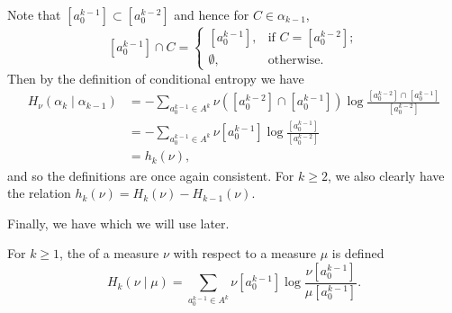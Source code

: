 Note that $[a_0^{k - 1}] \subset [a_0^{k - 2}]$ and hence for $C \in \alpha_{k - 1}$,
\[
	[a_0^{k - 1}] \cap C =
	\begin{cases}
		\left[a_0^{k - 1}\right],	& \text{if } C = [a_0^{k - 2}]; \\
		\emptyset,	& \text{otherwise}.
	\end{cases}
\]
Then by the definition of conditional entropy we have
\begin{align*}
	H_\nu(\alpha_k \mid \alpha_{k - 1}) &= -\sum_{a_0^{k - 1} \in A^k}{\nu([a_0^{k - 2}] \cap [a_0^{k - 1}]) \log{\frac{[a_0^{k - 2}] \cap [a_0^{k - 1}]}{[a_0^{k - 2}]}}} \\
		&= -\sum_{a_0^{k - 1} \in A^k}{\nu[a_0^{k - 1}] \log{\frac{[a_0^{k - 1}]}{[a_0^{k - 2}]}}} \\
		&= h_k(\nu),
\end{align*}
and so the definitions are once again consistent. For $k \geq 2$, we also clearly have the relation $h_k(\nu) = H_k(\nu) - H_{k - 1}(\nu)$.

Finally, we have  which we will use later.

\begin{definition}
	For $k \geq 1$, the  of a measure $\nu$ with respect to a measure $\mu$ is defined
	\[
		H_k(\nu \mid \mu) = \sum_{a_0^{k - 1} \in A^k}{\nu[a_0^{k - 1}] \log{\frac{\nu[a_0^{k - 1}]}{\mu[a_0^{k - 1}]}}}.
	\]
\end{definition}
